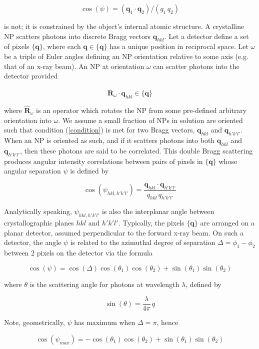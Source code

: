 \documentclass [11pt,fleqn]{article}
\def \be {\begin{equation}}
\def \ee {\end{equation}}
\begin{document}
\be \label{cpsi}
\cos (\psi) = (\bm q_1 \cdot \bm q_2)/(q_1 \, q_2 )
\ee

 is not; it is constrained by the object's internal atomic structure. A crystalline NP scatters photons into discrete Bragg vectors $\bm q_{hkl}$. Let a detector define  a set of pixels $\{\bm q\}$, where each $\bm q \in \{\bm q\}$ has a unique position in reciprocal space. Let $\omega$ be a triple of Euler angles defining an NP orientation relative to some axis (e.g. that of an x-ray beam). An NP at orientation $\omega$ can scatter photons into the detector provided 

\be \label{condition}
\hat{\bm R}_\omega \cdot \bm q_{hkl} \in \{\bm q\}
\ee

where $\hat{\bm R}_\omega$ is an operator which rotates the NP from some pre-defined arbitrary orientation into $\omega$. We assume a small fraction of NPs in solution are oriented such that condition (\ref{condition}) is met for two Bragg vectors, $\bm q_{hkl}$ and $\bm q_{h'k'l'}$. When an NP is oriented as such, and if it scatters photons into both $\bm q_{hkl}$ and $\bm q_{h'k'l'}$, then these photons are said to be correlated. This double Bragg scattering produces angular intensity correlations between pairs of pixels in $\{\bm q\}$ whose angular separation $\psi$ is defined by

\be \label{hklcorr}
\cos(\psi_{hkl,h'k'l'}) =\frac{ \bm q_{hkl} \cdot \bm q_{h'k'l'} } {q_{hkl}\, q_{h'k'l'}} 
\ee

Analytically speaking, $\psi_{hkl,h'k'l'}$ is also the interplanar angle between crystallographic planes $hkl$ and $h'k'l'$. Typically, the pixels $\{\bm q\}$ are arranged on a planar detector, assumed perpendicular to the forward x-ray beam. On such a detector, the angle $\psi$ is related to the azimuthal degree of separation $\Delta = \phi_1  - \phi_2$ between 2 pixels on the detector via the formula

\be \label{project}
\cos(\psi) = \cos( \Delta )\cos( \theta_1)\cos(\theta_2) + \sin(\theta_1)\sin(\theta_2)
\ee

where $\theta$ is the scattering angle for photons at wavelength $\lambda$, defined by

\be
\sin (\theta)   = \frac{ \lambda  }{ 4\pi } \, q
\ee

Note, geometrically, $\psi$ has maximum when $\Delta=\pi$, hence

\be \label{psimax}
\cos(\psi_{max}) = - \cos( \theta_1)\cos(\theta_2) + \sin(\theta_1)\sin(\theta_2)
\ee
\end{document}
